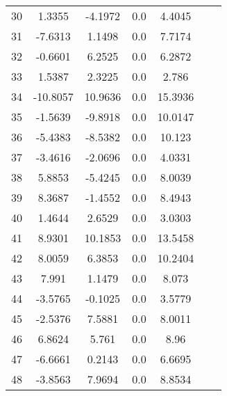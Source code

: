 \begin{table}
\begin{tabular}{ccccccc}
30 & 1.3355 & -4.1972 & 0.0 & 4.4045 \\ 
31 & -7.6313 & 1.1498 & 0.0 & 7.7174 \\ 
32 & -0.6601 & 6.2525 & 0.0 & 6.2872 \\ 
33 & 1.5387 & 2.3225 & 0.0 & 2.786 \\ 
34 & -10.8057 & 10.9636 & 0.0 & 15.3936 \\ 
35 & -1.5639 & -9.8918 & 0.0 & 10.0147 \\ 
36 & -5.4383 & -8.5382 & 0.0 & 10.123 \\ 
37 & -3.4616 & -2.0696 & 0.0 & 4.0331 \\ 
38 & 5.8853 & -5.4245 & 0.0 & 8.0039 \\ 
39 & 8.3687 & -1.4552 & 0.0 & 8.4943 \\ 
40 & 1.4644 & 2.6529 & 0.0 & 3.0303 \\ 
41 & 8.9301 & 10.1853 & 0.0 & 13.5458 \\ 
42 & 8.0059 & 6.3853 & 0.0 & 10.2404 \\ 
43 & 7.991 & 1.1479 & 0.0 & 8.073 \\ 
44 & -3.5765 & -0.1025 & 0.0 & 3.5779 \\ 
45 & -2.5376 & 7.5881 & 0.0 & 8.0011 \\ 
46 & 6.8624 & 5.761 & 0.0 & 8.96 \\ 
47 & -6.6661 & 0.2143 & 0.0 & 6.6695 \\ 
48 & -3.8563 & 7.9694 & 0.0 & 8.8534 \\ 
\hline 

  \end{tabular}
\end{table}
